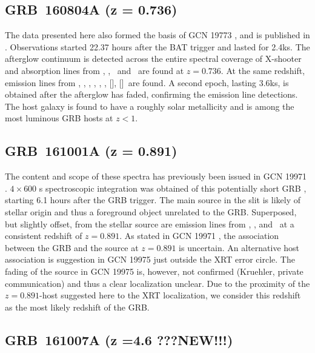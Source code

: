 \documentclass{aa}    %
\begin{document}
\subsection{GRB~160804A (z = 0.736)}\label{160804}

The data presented here also formed the basis of GCN 19773 \citep{GCN19773}, and
is published in \citet{Heintz2017b}. Observations started 22.37 hours after the
BAT trigger and lasted for 2.4ks. The afterglow continuum is detected across the
entire spectral coverage of X-shooter and absorption lines from \mgi, \mgii,
\feii~and \alii~are found at $z = 0.736$. At the same redshift, emission lines
from \oii, \oiii, \ha, \hb, \hg, \nii, [\sii], [\siii]~are found. A second epoch,
lasting 3.6ks, is obtained after the afterglow has faded, confirming the
emission line detections. The host galaxy is found to have a roughly solar
metallicity and is among the most luminous GRB hosts at $z < 1$.


\subsection{GRB~161001A (z = 0.891)}	\label{161001}

The content and scope of these spectra has previously been issued in GCN 19971
\citep{GCN19971}. $4 \times 600$ s spectroscopic integration was obtained of
this potentially short GRB \citep[GCN 19974;][]{GCN19974}, starting 6.1 hours
after the GRB trigger. The main source in the slit is likely of stellar origin
and thus a foreground object unrelated to the GRB. Superposed, but slightly
offset, from the stellar source are emission lines from \oii, \hb, and \ha~at a
consistent redshift of $z = 0.891$. As stated in GCN 19971 \citep{GCN19971}, the
association between the GRB and the source at $z = 0.891$ is uncertain. An
alternative host association is suggestion in GCN 19975 \citep{GCN19975} just
outside the XRT error circle. The fading of the source in GCN 19975
\citep{GCN19975} is, however, not confirmed (Kruehler, private communication)
and thus a clear localization unclear. Due to the proximity of the $z =
0.891$-host suggested here to the XRT localization, we consider this redshift as
the most likely redshift of the GRB.

\subsection{GRB~161007A (z =4.6 ???NEW!!!)} \label{161007}
\end{document}
